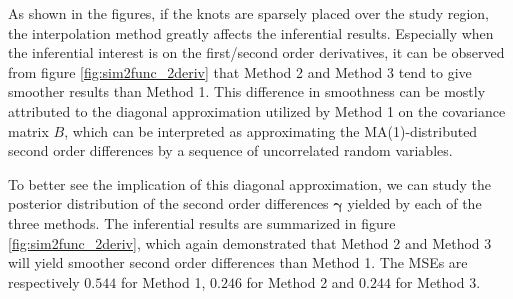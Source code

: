 \documentclass{article}
\begin{document}
As shown in the figures, if the knots are sparsely placed over the study region, the interpolation method greatly affects the inferential results. Especially when the inferential interest is on the first/second order derivatives, it can be observed from figure \ref{fig:sim2func_2deriv} that Method 2 and Method 3 tend to give smoother results than Method 1. This difference in smoothness can be mostly attributed to the diagonal approximation utilized by Method 1 on the covariance matrix $B$, which can be interpreted as approximating the MA(1)-distributed second order differences by a sequence of uncorrelated random variables.

To better see the implication of this diagonal approximation, we can study the posterior distribution of the second order differences $\boldsymbol{\gamma}$ yielded by each of the three methods. The inferential results are summarized in figure \ref{fig:sim2func_2deriv}, which again demonstrated that Method 2 and Method 3 will yield smoother second order differences than Method 1. The MSEs are respectively $0.544$ for Method 1, $0.246$ for Method 2 and $0.244$ for Method 3.
\end{document}
